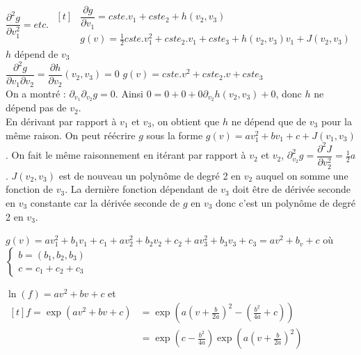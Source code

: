 \documentclass[12pt,a4paper]{article}
\begin{document}
\begin{dem}
\begin{minipage}[t]{18cm}
\begin{dem}
\begin{minipage}[t]{17.5cm}
			$\dfrac{\partial^2 g}{\partial v_1^2} = etc.$\hspace{.5cm} $\begin{aligned}[t]
				&\dfrac{\partial g}{\partial v_1} = cste.v_1 + cste_2 + h(v_2,v_3)\\
				&g(v) = \frac12 cste.v_1^2 + cste_2.v_1 + cste_3 + h(v_2,v_3)v_1 + J(v_2,v_3)
			\end{aligned}$\\
			\hspace*{4cm} $h$ dépend de $v_3$\\
			$\dfrac{\partial^2 g}{\partial v_1 \partial v_2} = \dfrac{\partial h}{\partial v_2}(v_2,v_3) = 0$ \hspace{1cm} $g(v) = cste.v^2 + cste_2.v + cste_3$\\
			On a montré : $\partial_{v_1}\partial_{v_2} g = 0$. Ainsi $0=0+0+0\partial_{v_2} h(v_2,v_3)+0$, donc $h$ ne dépend pas de $v_2$.\\
			En dérivant par rapport à $v_1$ et $v_3$, on obtient que $h$ ne dépend que de $v_3$ pour la même raison. On peut réécrire $g$ sous la forme $g(v) = av_1^2 + bv_1 + c + J(v_1,v_3)$. On fait le même raisonnement en itérant par rapport à $v_2$ et $v_2$, $\partial_{v_2}^2 g = \dfrac{\partial^2 J}{\partial v_2^2} = \frac12 a$. $J(v_2,v_3)$ est de nouveau un polynôme de degré 2 en $v_2$ auquel on somme une fonction de $v_3$. La dernière fonction dépendant de $v_3$ doit être de dérivée seconde en $v_3$ constante car la dérivée seconde de $g$ en $v_3$ donc c'est un polynôme de degré 2 en $v_3$.
			
			\vspace{-.5cm}
			
			$g(v) = av_1^2 +b_1v_1 + c_1 + av_2^2 + b_2v_2+c_2 + av_3^2 + b_3v_3 + c_3 = av^2 + b_v + c$ où  $\begin{cases}
				b  = (b_1, b_2, b_3)\\
				c = c_1+c_2+c_3
			\end{cases}$	
			
			\vspace*{-.8cm}		
			\end{minipage}		
			\end{dem}
			\end{minipage}	
			
			$\ln(f) = av^2 + bv + c$ et $\begin{aligned}[t]
				f = \exp(av^2+bv+c) &= \exp\left(a\left(v+\frac b{2a}\right)^2-\left(\frac{b^2}{4a}+c\right)\right)\\
				&= \exp\left(c-\frac{b^2}{4a}\right)\exp\left(a\left(v+\frac b{2a}\right)^2\right)
			\end{aligned}$\\
			

\end{dem}
\end{document}
